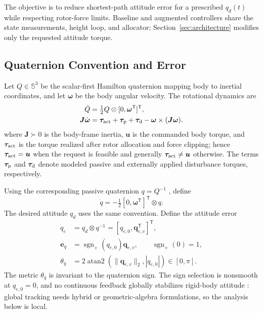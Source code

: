 \documentclass[letterpaper, 10 pt, conference]{ieeeconf}
\newcommand{\T}{^{\mathsf T}}
\newcommand{\sgnp}{\operatorname{sgn}_{+}}
\begin{document}
The objective is to reduce shortest-path attitude error for a prescribed
$q_d(t)$ while respecting rotor-force limits. Baseline and augmented
controllers share the state measurements, height loop, and allocator;
Section~\ref{sec:architecture} modifies only the requested attitude torque.

%

\subsection{Quaternion Convention and Error}

Let $Q\in\mathbb S^3$ be the scalar-first Hamilton quaternion mapping body to
inertial coordinates, and let $\bm\omega$ be the body angular velocity. The
rotational dynamics are \cite{schaub2018amss}
\begin{align}
 \dot Q&=\tfrac12 Q\otimes[0,\bm\omega\T]\T,\\
 \bm J\dot{\bm\omega}&=\bm\tau_{\rm act}+\bm\tau_{\rm p}
       +\bm\tau_{\rm d}-\bm\omega\times(\bm J\bm\omega).
 \label{eq:plant}
\end{align}
where $\bm J\succ0$ is the body-frame inertia, $\bm u$ is the commanded
body torque, and $\bm\tau_{\rm act}$ is the torque realized after rotor
allocation and force clipping; hence $\bm\tau_{\rm act}=\bm u$ when the
request is feasible and generally $\bm\tau_{\rm act}\neq\bm u$ otherwise.
The terms $\bm\tau_{\rm p}$ and $\bm\tau_{\rm d}$ denote modeled passive and
externally applied disturbance torques, respectively.

Using the corresponding passive quaternion $q=Q^{-1}$ \cite{diebel2006quaternion}, define
\begin{equation}
 \dot q=-\tfrac12[0,\bm\omega\T]\T\otimes q.
 \label{eq:passive}
\end{equation}
The desired attitude $q_d$ uses the same convention. Define the attitude error
\begin{align}
 q_e&=q_d\otimes q^{-1}=[q_{e,0},\bm q_{e,v}\T]\T,\\
 \bm e_q&=\sgnp(q_{e,0})\bm q_{e,v},\qquad \sgnp(0)=1,\\
 \theta_q&=2\operatorname{atan2}(\|\bm q_{e,v}\|_2,|q_{e,0}|)
             \in[0,\pi].
 \label{eq:theta}
\end{align}
The metric $\theta_q$ is invariant to the quaternion sign. The sign selection is nonsmooth at
$q_{e,0}=0$, and no continuous feedback globally stabilizes rigid-body attitude
\cite{bhat2000topological,chaturvedi2011rigid}: global tracking needs hybrid
\cite{mayhew2011hybrid} or geometric-algebra \cite{rubioscola2026ga,escamilla2023ga}
formulations, so the analysis below is local.
\end{document}
